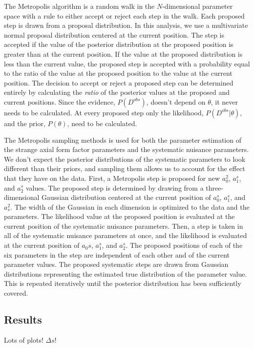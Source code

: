     The Metropolis algorithm is a random walk in the $N$-dimensional parameter
    space with a rule to either accept or reject each step in the walk. Each
    proposed step is drawn from a proposal distribution.  In this analysis, we
    use a multivariate normal proposal distribution centered at the current
    position.  The step is accepted if the value of the posterior distribution
    at the proposed position is greater than at the current position. If the
    value at the proposed distribution is less than the current value, the
    proposed step is accepted with a probability equal to the ratio of the
    value at the proposed position to the value at the current position. The
    decision to accept or reject a proposed step can be determined entirely by
    calculating the \textit{ratio} of the posterior values at the proposed and
    current positions. Since the evidence, $P(D^{obs})$, doesn't depend on
    $\theta$, it never needs to be calculated. At every proposed step only the
    likelihood, $P(D^{obs}|\theta)$, and the prior, $P(\theta)$, need to be
    calculated.

    The Metropolis sampling methods is used for both the parameter estimation
    of the strange axial form factor parameters and the systematic nuisance
    parameters. We don't expect the posterior distributions of the systematic
    parameters to look different than their priors, and sampling them allows us
    to account for the effect that they have on the data.  First, a Metropolis
    step is proposed for new $a_0^2$, $a_1^s$, and $a_2^s$ values. The proposed
    step is determined by drawing from a three-dimensional Gaussian
    distribution centered at the current position of $a_0^s$, $a_1^s$, and
    $a_s^2$. The width of the Gaussian in each dimension is optimized to the
    data and the parameters. The likelihood value at the proposed position is
    evaluated at the current position of the systematic nuisance parameters.
    Then, a step is taken in all of the systematic nuisance parameters at once,
    and the likelihood is evaluated at the current position of $a_0s$, $a_1^s$,
    and $a_2^s$. The proposed positions of each of the six parameters in the
    step are independent of each other and of the current parameter values. The
    proposed systematic steps are drawn from Gaussian distributions
    representing the estimated true distribution of the parameter value. This
    is repeated iteratively until the posterior distribution has been
    sufficiently covered.

\subsection{Results}\label{sec:results}
  Lots of plots! $\Delta s$!


